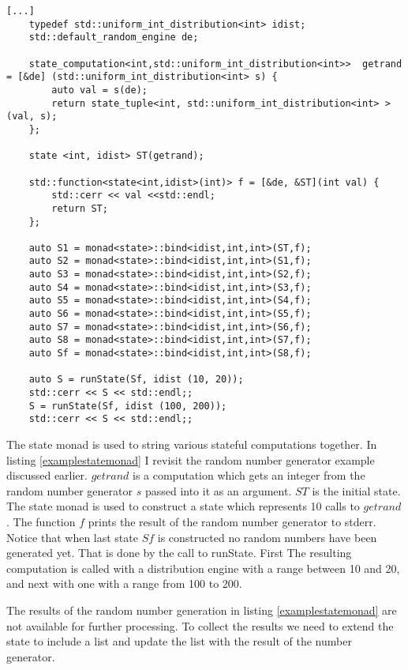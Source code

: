 \documentclass[12pt,fleqn]{article}
\begin{document}
\begin{lstlisting}[caption=example of the state monad, label=examplestatemonad]
[...]
	typedef std::uniform_int_distribution<int> idist;
	std::default_random_engine de;

	state_computation<int,std::uniform_int_distribution<int>>  getrand = [&de] (std::uniform_int_distribution<int> s) {
		auto val = s(de);
		return state_tuple<int, std::uniform_int_distribution<int> >(val, s);
	}; 

	state <int, idist> ST(getrand);
	
	std::function<state<int,idist>(int)> f = [&de, &ST](int val) {
		std::cerr << val <<std::endl; 
		return ST;
	};

	auto S1 = monad<state>::bind<idist,int,int>(ST,f);
	auto S2 = monad<state>::bind<idist,int,int>(S1,f);
	auto S3 = monad<state>::bind<idist,int,int>(S2,f);
	auto S4 = monad<state>::bind<idist,int,int>(S3,f);
	auto S5 = monad<state>::bind<idist,int,int>(S4,f);
	auto S6 = monad<state>::bind<idist,int,int>(S5,f);
	auto S7 = monad<state>::bind<idist,int,int>(S6,f);
	auto S8 = monad<state>::bind<idist,int,int>(S7,f);
	auto Sf = monad<state>::bind<idist,int,int>(S8,f);

    auto S = runState(Sf, idist (10, 20));
	std::cerr << S << std::endl;;
	S = runState(Sf, idist (100, 200));
	std::cerr << S << std::endl;;

\end{lstlisting}  

The state monad is used to string various stateful computations together. 
In listing \ref{examplestatemonad} I revisit the random number generator example discussed earlier.
$getrand$ is a computation which gets an integer from the random number generator $s$ passed into it as an argument.
$ST$ is the initial state. The state monad is used to construct a state which represents 10 calls to $getrand$.
The function $f$ prints the result of the random number generator to stderr.
Notice that when last state $Sf$ is constructed no random numbers have been generated yet.
That is done by the call to runState.
First The resulting computation is called with a distribution engine with a range between 10 and 20, and next with one with a range from 100 to 200.

The results of the random number generation in listing \ref{examplestatemonad} are not available for further processing.
To collect the results we need to extend the state to include a list and update the list with the result of the number generator.
\end{document}
